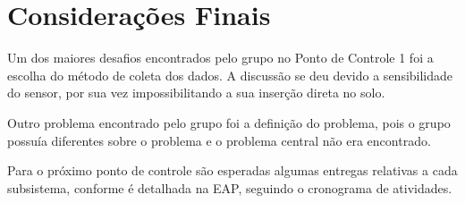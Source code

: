 \chapter{Considerações Finais}
  Um dos maiores desafios encontrados pelo grupo no Ponto de Controle 1 foi a escolha do método de coleta dos dados.
  A discussão se deu devido a sensibilidade do sensor, por sua vez impossibilitando a sua inserção direta no solo.

  Outro problema encontrado pelo grupo foi a definição do problema, pois o grupo possuía diferentes sobre o problema e o
  problema central não era encontrado.

  Para o próximo ponto de controle são esperadas algumas entregas relativas a cada subsistema, conforme é detalhada na EAP, seguindo o cronograma de atividades.
